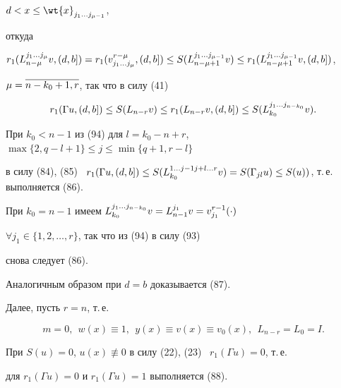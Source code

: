 \begin{pf}
$d<x\le \wt{x}_{j_1\dotsc j_{\mu-1}}$,


откуда


$r_1(\l{L}{j_1\dotsc j_{\mu}}{n-\mu}v,(d,b])=


r_1(v^{r-\mu}_{j_1\dotsc j_{\mu}},(d,b])\le


S(\l{L}{j_1\dotsc j_{\mu-1}}{n-\mu+1}v)\le


r_1(\l{L}{j_1\dotsc j_{\mu-1}}{n-\mu+1}v,(d,b])$,


$\mu=\overline{n-k_0+1,r}$, так что в силу (41)


\begin{equation}


r_1(\Gamma u,(d,b])\le S(L_{n-r}v)\le r_1(L_{n-r}v,(d,b])\le


S(\l{L}{j_1\dotsc j_{n-k_0}}{k_0}v).


\end{equation}


При $k_0<n-1$ из (94) для $l=k_0-n+r$, $\max\{2,q-l+1\}\le j\le\min\{q+1,r-l\}$


в силу (84), (85) \ $r_1(\Gamma u,(d,b])\le S(\l{L}{1\dotsc


j-1 j+l\dotsc r}{k_0}v)=


S(\Gamma_{jl}u)\le S(u))$, т.\,е. выполняется (86).


При $k_0=n-1$ имеем $\l{L}{j_1\dotsc


j_{n-k_0}}{k_0}v=\l{L}{j_1}{n-1}v=\l{v}{r-1}{j_1}(\cdot)$


\; $\forall j_1\in\{ 1,2,\dotsc,r\}$, так что из (94) в силу (93)


снова следует (86).





Аналогичным образом при $d=b$ доказывается (87).





Далее, пусть $r=n$, т.\,е.


\begin{equation}


m=0,\ \ w(x)\equiv 1,\ \ y(x)\equiv v(x)\equiv v_0(x),\ \ L_{n-r}=L_0=I.


\end{equation}


При $S(u)=0$, $u(x)\not\equiv 0$ в силу (22), (23) \ $r_1(\Gamma u)=0$, т.\,е.


для $r_1(\Gamma u)=0$ и $r_1(\Gamma u)=1$ выполняется (88).






\end{pf}
